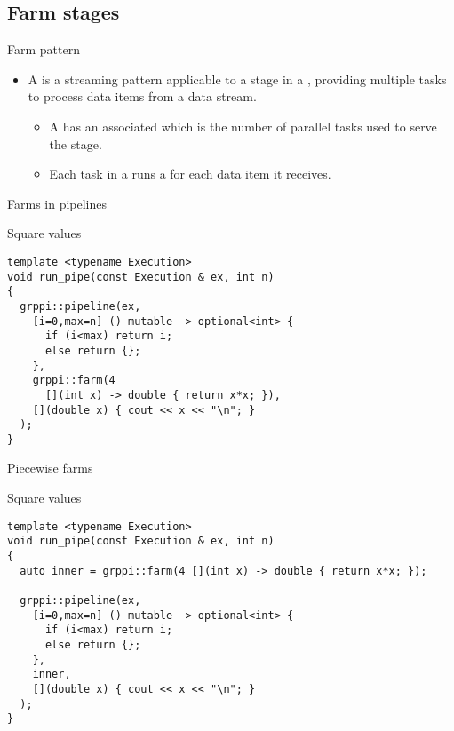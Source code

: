 \subsection{Farm stages}

\begin{frame}[t]{Farm pattern}
\begin{itemize}
  \item A  is a streaming pattern applicable to a stage in a ,
        providing multiple tasks to process data items from a data stream.
    \begin{itemize}
      \item A  has an associated  which is the number of parallel
             tasks used to serve the stage.
      \item Each task in a  runs a  for each data item it receives.
    \end{itemize}
\end{itemize}
\end{frame}

\begin{frame}[t,fragile]{Farms in pipelines}
\begin{block}{Square values}
\begin{lstlisting}
template <typename Execution>
void run_pipe(const Execution & ex, int n)
{
  grppi::pipeline(ex,
    [i=0,max=n] () mutable -> optional<int> {
      if (i<max) return i;
      else return {};
    },
    grppi::farm(4
      [](int x) -> double { return x*x; }),
    [](double x) { cout << x << "\n"; }
  );
}
\end{lstlisting}
\end{block}
\end{frame}

\begin{frame}[t,fragile]{Piecewise farms}
\begin{block}{Square values}
\begin{lstlisting}
template <typename Execution>
void run_pipe(const Execution & ex, int n)
{
  auto inner = grppi::farm(4 [](int x) -> double { return x*x; });

  grppi::pipeline(ex,
    [i=0,max=n] () mutable -> optional<int> {
      if (i<max) return i;
      else return {};
    },
    inner,
    [](double x) { cout << x << "\n"; }
  );
}
\end{lstlisting}
\end{block}
\end{frame}
